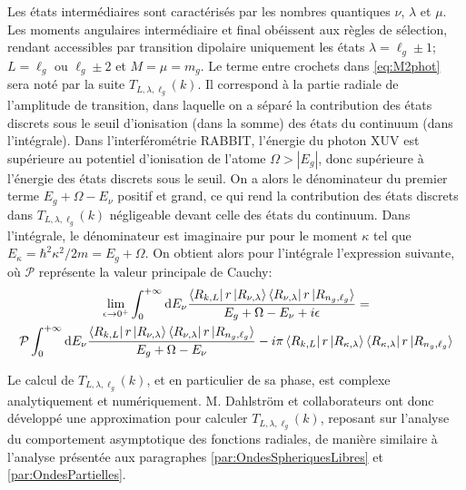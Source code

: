 Les états intermédiaires sont caractérisés par les nombres quantiques $\nu$, $\lambda$ et $\mu$. Les moments angulaires intermédiaire et final obéissent aux règles de sélection, rendant accessibles par transition dipolaire uniquement les états $\lambda = \ell_g \pm 1$; $L = \ell_g$ ou $\ell_g \pm 2$ et $M = \mu = m_g$. Le terme entre crochets dans \ref{eq:M2phot} sera noté par la suite $T_{L,\lambda,\ell_g}(k)$. Il correspond à la partie radiale de l'amplitude de transition, dans laquelle on a séparé la contribution des états discrets sous le seuil d'ionisation (dans la somme) des états du continuum (dans l'intégrale). Dans l'interférométrie RABBIT, l'énergie du photon XUV est supérieure au potentiel d'ionisation de l'atome $\Omega > |E_g|$, donc supérieure à l'énergie des états discrets sous le seuil. On a alors le dénominateur du premier terme $E_g + \Omega - E_\nu$ positif et grand, ce qui rend la contribution des états discrets dans $T_{L,\lambda,\ell_g}(k)$ négligeable devant celle des états du continuum. Dans l'intégrale, le dénominateur est imaginaire pur pour le moment $\kappa$ tel que $E_\kappa = \hbar^2 \kappa^2 / 2m = E_g + \Omega$. On obtient alors pour l'intégrale l'expression suivante, où $ \mathcal{P}$ représente la valeur principale de Cauchy:
\begin{multline}
 \lim \limits_{\epsilon \rightarrow 0^+} \int_{0}^{+\infty} \mathrm{d} E_\nu \frac{\bra{R_{k,L}} r \ket{R_{\nu,\lambda}} \bra{R_{\nu,\lambda}} r \ket{R_{n_g,\ell_g}}} {E_g + \Omega - E_{\nu} +i \epsilon} = \\
 \mathcal{P} \int_{0}^{+\infty} \mathrm{d} E_\nu \frac{\bra{R_{k,L}} r \ket{R_{\nu,\lambda}} \bra{R_{\nu,\lambda}} r \ket{R_{n_g,\ell_g}}} {E_g + \Omega - E_{\nu}} - i \pi \bra{R_{k,L}} r \ket{R_{\kappa,\lambda}} \bra{R_{\kappa,\lambda}} r \ket{R_{n_g,\ell_g}}
\end{multline}

Le calcul de $T_{L,\lambda,\ell_g}(k)$, et en particulier de sa phase, est complexe analytiquement et numériquement. M. Dahlström et collaborateurs  ont donc développé une approximation pour calculer $T_{L,\lambda,\ell_g}(k)$, reposant sur l'analyse du comportement asymptotique des fonctions radiales, de manière similaire à l'analyse présentée aux paragraphes \ref{par:OndesSpheriquesLibres} et  \ref{par:OndesPartielles}.

